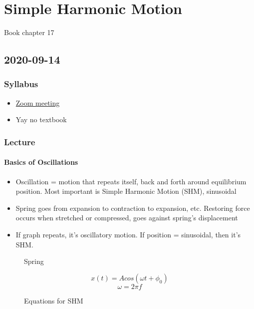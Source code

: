 \chapter{Simple Harmonic Motion}

Book chapter 17

\section{2020-09-14}

\subsection{Syllabus}

\begin{itemize}
    \item \href{https://calpoly.zoom.us/j/680327688}{Zoom meeting}
    \item Yay no textbook
\end{itemize}

\subsection{Lecture}

\subsubsection{Basics of Oscillations}

\begin{itemize}
    \item Oscillation = motion that repeats itself, back and forth around equilibrium position. Most important is Simple Harmonic Motion (SHM), sinusoidal
    \item Spring goes from expansion to contraction to expansion, etc. Restoring force occurs when stretched or compressed, goes against spring's displacement
    \item If graph repeats, it's oscillatory motion. If position = sinusoidal, then it's SHM. 
\end{itemize}

\begin{figure}
    \centering
    
    \caption{Spring}
\end{figure}

\begin{figure}
    \centering
    
    $$x(t) = Acos(\omega t + \phi_0)$$
    $$\omega = 2 \pi f$$
    
    \caption{Equations for SHM}
\end{figure}


